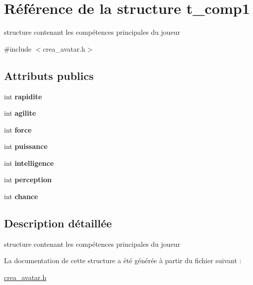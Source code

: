 \hypertarget{structt__comp1}{\section{Référence de la structure t\-\_\-comp1}
\label{structt__comp1}
}


structure contenant les compétences principales du joueur  




{\ttfamily \#include $<$crea\-\_\-avatar.\-h$>$}

\subsection*{Attributs publics}
\begin{DoxyCompactItemize}
\item 
\hypertarget{structt__comp1_a931e9cfb7691ac9634c3d33132adfd86}{int {\bfseries rapidite}}\label{structt__comp1_a931e9cfb7691ac9634c3d33132adfd86}

\item 
\hypertarget{structt__comp1_a58c59871ab29274a72aec52d0231efe6}{int {\bfseries agilite}}\label{structt__comp1_a58c59871ab29274a72aec52d0231efe6}

\item 
\hypertarget{structt__comp1_a9c20e2becdfa76d24075e308cc67653d}{int {\bfseries force}}\label{structt__comp1_a9c20e2becdfa76d24075e308cc67653d}

\item 
\hypertarget{structt__comp1_a142ea50556236d4082c37dd3fa31bc32}{int {\bfseries puissance}}\label{structt__comp1_a142ea50556236d4082c37dd3fa31bc32}

\item 
\hypertarget{structt__comp1_a35ab44531b8339054321a5d48c27894f}{int {\bfseries intelligence}}\label{structt__comp1_a35ab44531b8339054321a5d48c27894f}

\item 
\hypertarget{structt__comp1_a66cfc7b3a557f28b51eae67aaadbd326}{int {\bfseries perception}}\label{structt__comp1_a66cfc7b3a557f28b51eae67aaadbd326}

\item 
\hypertarget{structt__comp1_a5bfb70170d30b067761356d414228cb9}{int {\bfseries chance}}\label{structt__comp1_a5bfb70170d30b067761356d414228cb9}

\end{DoxyCompactItemize}


\subsection{Description détaillée}
structure contenant les compétences principales du joueur 

La documentation de cette structure a été générée à partir du fichier suivant \-:\begin{DoxyCompactItemize}
\item 
\hyperlink{crea__avatar_8h}{crea\-\_\-avatar.\-h}\end{DoxyCompactItemize}
